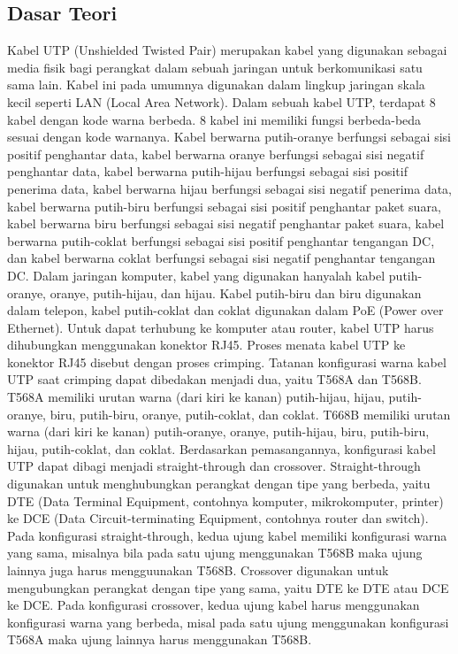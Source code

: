 \subsection{Dasar Teori}
Kabel UTP (Unshielded Twisted Pair) merupakan kabel yang digunakan sebagai media fisik bagi perangkat dalam sebuah jaringan untuk berkomunikasi satu sama lain. Kabel ini pada umumnya digunakan dalam lingkup jaringan skala kecil seperti LAN (Local Area Network). Dalam sebuah kabel UTP, terdapat 8 kabel dengan kode warna berbeda. 8 kabel ini memiliki fungsi berbeda-beda sesuai dengan kode warnanya. Kabel berwarna putih-oranye berfungsi sebagai sisi positif penghantar data, kabel berwarna oranye berfungsi sebagai sisi negatif penghantar data, kabel berwarna putih-hijau berfungsi sebagai sisi positif penerima data, kabel berwarna hijau berfungsi sebagai sisi negatif penerima data, kabel berwarna putih-biru berfungsi sebagai sisi positif penghantar paket suara, kabel berwarna biru berfungsi sebagai sisi negatif penghantar paket suara, kabel berwarna putih-coklat berfungsi sebagai sisi positif penghantar tengangan DC, dan kabel berwarna coklat berfungsi sebagai sisi negatif penghantar tengangan DC. Dalam jaringan komputer, kabel yang digunakan hanyalah kabel putih-oranye, oranye, putih-hijau, dan hijau. Kabel putih-biru dan biru digunakan dalam telepon, kabel putih-coklat dan coklat digunakan dalam PoE (Power over Ethernet). Untuk dapat terhubung ke komputer atau router, kabel UTP harus dihubungkan menggunakan konektor RJ45. Proses menata kabel UTP ke konektor RJ45 disebut dengan proses crimping. Tatanan konfigurasi warna kabel UTP saat crimping dapat dibedakan menjadi dua, yaitu T568A dan T568B. T568A memiliki urutan warna (dari kiri ke kanan) putih-hijau, hijau, putih-oranye, biru, putih-biru, oranye, putih-coklat, dan coklat. T668B memiliki urutan warna (dari kiri ke kanan) putih-oranye, oranye, putih-hijau, biru, putih-biru, hijau, putih-coklat, dan coklat. Berdasarkan pemasangannya, konfigurasi kabel UTP dapat dibagi menjadi straight-through dan crossover. Straight-through digunakan untuk menghubungkan perangkat dengan tipe yang berbeda, yaitu DTE (Data Terminal Equipment, contohnya komputer, mikrokomputer, printer) ke DCE (Data Circuit-terminating Equipment, contohnya router dan switch). Pada konfigurasi straight-through, kedua ujung kabel memiliki konfigurasi warna yang sama, misalnya bila pada satu ujung menggunakan T568B maka ujung lainnya juga harus mengguunakan T568B. Crossover digunakan untuk mengubungkan perangkat dengan tipe yang sama, yaitu DTE ke DTE atau DCE ke DCE. Pada konfigurasi crossover, kedua ujung kabel harus menggunakan konfigurasi warna yang berbeda, misal pada satu ujung menggunakan konfigurasi T568A maka ujung lainnya harus menggunakan T568B. 

